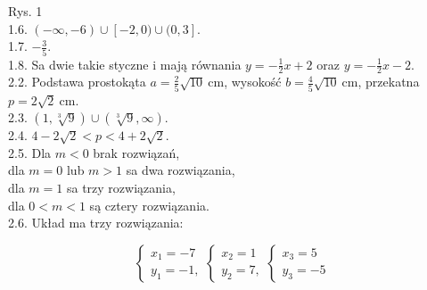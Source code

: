 \documentclass[10pt]{article}
\begin{document}
Rys. 1\\
1.6. $(-\infty,-6) \cup[-2,0) \cup(0,3]$.\\
1.7. $-\frac{3}{5}$.\\
1.8. Sa dwie takie styczne i mają równania $y=-\frac{1}{2} x+2$ oraz $y=-\frac{1}{2} x-2$.\\
2.2. Podstawa prostokąta $a=\frac{2}{5} \sqrt{10} \mathrm{~cm}$, wysokość $b=\frac{4}{5} \sqrt{10} \mathrm{~cm}$, przekatna $p=2 \sqrt{2} \mathrm{~cm}$.\\
2.3. $(1, \sqrt[3]{9}) \cup(\sqrt[3]{9}, \infty)$.\\
2.4. $4-2 \sqrt{2}<p<4+2 \sqrt{2}$.\\
2.5. Dla $m<0$ brak rozwiązań,\\
dla $m=0$ lub $m>1$ sa dwa rozwiązania,\\
dla $m=1$ sa trzy rozwiązania,\\
dla $0<m<1$ są cztery rozwiązania.\\
2.6. Układ ma trzy rozwiązania:

$$
\left\{\begin{array} { l } 
{ x _ { 1 } = - 7 } \\
{ y _ { 1 } = - 1 , }
\end{array} \left\{\begin{array} { l } 
{ x _ { 2 } = 1 } \\
{ y _ { 2 } = 7 , }
\end{array} \left\{\begin{array}{l}
x_{3}=5 \\
y_{3}=-5
\end{array}\right.\right.\right.
$$
\end{document}
